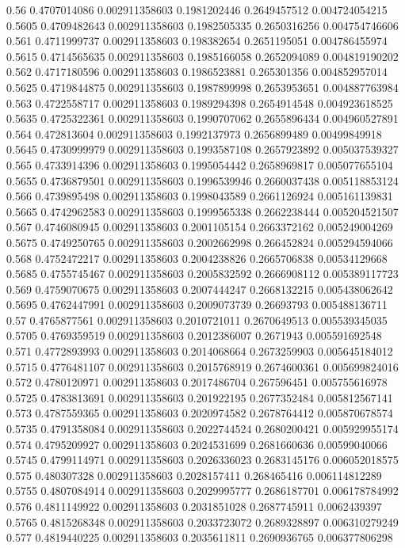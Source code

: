 {0.56 0.4707014086 0.002911358603 0.1981202446 0.2649457512 0.004724054215
0.5605 0.4709482643 0.002911358603 0.1982505335 0.2650316256 0.004754746606
0.561 0.4711999737 0.002911358603 0.198382654 0.2651195051 0.004786455974
0.5615 0.4714565635 0.002911358603 0.1985166058 0.2652094089 0.004819190202
0.562 0.4717180596 0.002911358603 0.1986523881 0.265301356 0.004852957014
0.5625 0.4719844875 0.002911358603 0.1987899998 0.2653953651 0.004887763984
0.563 0.4722558717 0.002911358603 0.1989294398 0.2654914548 0.004923618525
0.5635 0.4725322361 0.002911358603 0.1990707062 0.2655896434 0.004960527891
0.564 0.472813604 0.002911358603 0.1992137973 0.2656899489 0.00499849918
0.5645 0.4730999979 0.002911358603 0.1993587108 0.2657923892 0.005037539327
0.565 0.4733914396 0.002911358603 0.1995054442 0.2658969817 0.005077655104
0.5655 0.4736879501 0.002911358603 0.1996539946 0.2660037438 0.005118853124
0.566 0.4739895498 0.002911358603 0.1998043589 0.2661126924 0.005161139831
0.5665 0.4742962583 0.002911358603 0.1999565338 0.2662238444 0.005204521507
0.567 0.4746080945 0.002911358603 0.2001105154 0.2663372162 0.005249004269
0.5675 0.4749250765 0.002911358603 0.2002662998 0.266452824 0.005294594066
0.568 0.4752472217 0.002911358603 0.2004238826 0.2665706838 0.00534129668
0.5685 0.4755745467 0.002911358603 0.2005832592 0.2666908112 0.005389117723
0.569 0.4759070675 0.002911358603 0.2007444247 0.2668132215 0.005438062642
0.5695 0.4762447991 0.002911358603 0.2009073739 0.26693793 0.005488136711
0.57 0.4765877561 0.002911358603 0.2010721011 0.2670649513 0.005539345035
0.5705 0.4769359519 0.002911358603 0.2012386007 0.2671943 0.005591692548
0.571 0.4772893993 0.002911358603 0.2014068664 0.2673259903 0.005645184012
0.5715 0.4776481107 0.002911358603 0.2015768919 0.2674600361 0.005699824016
0.572 0.4780120971 0.002911358603 0.2017486704 0.267596451 0.005755616978
0.5725 0.4783813691 0.002911358603 0.201922195 0.2677352484 0.005812567141
0.573 0.4787559365 0.002911358603 0.2020974582 0.2678764412 0.005870678574
0.5735 0.4791358084 0.002911358603 0.2022744524 0.2680200421 0.005929955174
0.574 0.4795209927 0.002911358603 0.2024531699 0.2681660636 0.00599040066
0.5745 0.4799114971 0.002911358603 0.2026336023 0.2683145176 0.006052018575
0.575 0.480307328 0.002911358603 0.2028157411 0.268465416 0.006114812289
0.5755 0.4807084914 0.002911358603 0.2029995777 0.2686187701 0.006178784992
0.576 0.4811149922 0.002911358603 0.2031851028 0.2687745911 0.0062439397
0.5765 0.4815268348 0.002911358603 0.2033723072 0.2689328897 0.006310279249
0.577 0.4819440225 0.002911358603 0.2035611811 0.2690936765 0.006377806298
}
